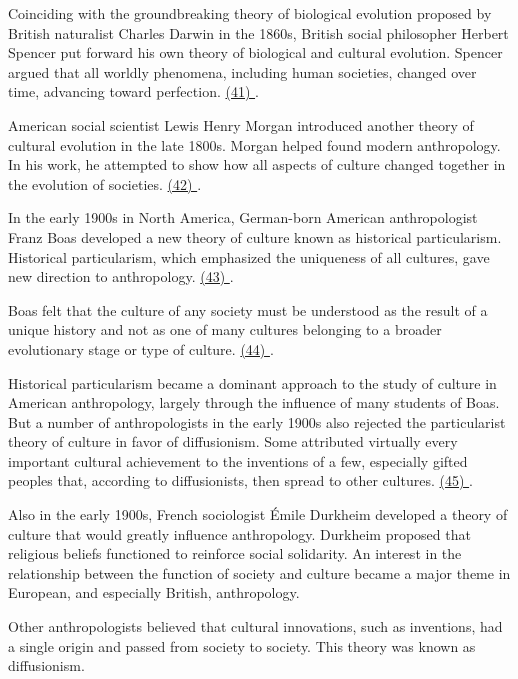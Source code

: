 
\qquad Coinciding with the groundbreaking theory of biological evolution proposed by British naturalist Charles Darwin in the 1860s, British social philosopher Herbert Spencer put forward his own theory of biological and cultural evolution. Spencer argued that all worldly phenomena, including human societies, changed over time, advancing toward perfection. \ul{(41) \qquad\qquad\qquad\qquad}.

\qquad American social scientist Lewis Henry Morgan introduced another theory of cultural evolution in the late 1800s. Morgan helped found modern anthropology. In his work, he attempted to show how all aspects of culture changed together in the evolution of societies. \ul{(42) \qquad\qquad\qquad\qquad}.

\qquad In the early 1900s in North America, German-born American anthropologist Franz Boas developed a new theory of culture known as historical particularism. Historical particularism, which emphasized the uniqueness of all cultures, gave new direction to anthropology. \ul{(43) \qquad\qquad\qquad\qquad}.

\qquad Boas felt that the culture of any society must be understood as the result of a unique history and not as one of many cultures belonging to a broader evolutionary stage or type of culture. \ul{(44) \qquad\qquad\qquad\qquad}.

\qquad Historical particularism became a dominant approach to the study of culture in American anthropology, largely through the influence of many students of Boas. But a number of anthropologists in the early 1900s also rejected the particularist theory of culture in favor of diffusionism. Some attributed virtually every important cultural achievement to the inventions of a few, especially gifted peoples that, according to diffusionists, then spread to other cultures. \ul{(45) \qquad\qquad\qquad\qquad}.

\qquad Also in the early 1900s, French sociologist \'{E}mile Durkheim developed a theory of culture that would greatly influence anthropology. Durkheim proposed that religious beliefs functioned to reinforce social solidarity. An interest in the relationship between the function of society and culture became a major theme in European, and especially British, anthropology.

\vspace{6pt}

\qquad [A] Other anthropologists believed that cultural innovations, such as inventions, had a single origin and passed from society to society. This theory was known as diffusionism.

